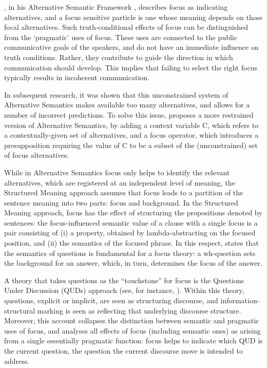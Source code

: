 \textcite{rooth1985association}, in his Alternative Semantic Framework \parencite{rooth1985association, rooth1992theory}, describes focus as indicating alternatives, and a focus sensitive particle is one whose meaning depends on those focal alternatives.
Such truth-conditional effects of focus can be distinguished from the `pragmatic’ uses of focus. These uses are connected to the public communicative goals of the speakers, and do not have an immediate influence on truth conditions. Rather, they contribute to guide the direction in which communication should develop. This implies that failing to select the right focus typically results in incoherent communication. 

In subsequent research, it was shown that this unconstrained system of Alternative Semantics makes available too many alternatives, and allows for a number of incorrect predictions. To solve this issue, \textcite{rooth1992theory} proposes a more restrained version of Alternative Semantics, by adding a context variable C, which refers to a contextually-given set of alternatives, and a focus operator, which introduces a presupposition requiring the value of C to be a subset of the (unconstrained) set of focus alternatives.

While in Alternative Semantics focus only helps to identify the relevant alternatives, which are registered at an independent level of meaning, the Structured Meaning approach \parencite{von1982structured, von1990current, jacobs2012fokus, krifka1991compositional, krifka2008basic} assumes that focus leads to a partition of the sentence meaning into two parts: focus and background. In the Structured Meaning approach, focus has the effect of structuring the propositions denoted by sentences: the focus-influenced semantic value of a clause with a single focus is a pair consisting of (i) a property, obtained by lambda-abstracting on the focused position, and (ii) the semantics of the focused phrase.
In this respect, \textcite[38]{von1991focusing} states that the semantics of questions is fundamental for a focus theory: a wh-question sets the background for an answer, which, in turn, determines the focus of the answer. 

A theory that takes questions as the ``touchstone” for focus is the Questions Under Discussion (QUDs) approach (see, for instance, \cite{roberts1996information, buring2003d, beaver2009sense}). Within this theory, 
questions, explicit or implicit, are seen as structuring discourse, and information-structural marking is seen as reflecting that underlying discourse structure. Moreover, this account collapses the distinction between semantic and pragmatic uses of focus, and analyses all effects of focus (including semantic ones) as arising from a single essentially pragmatic function: focus helps to indicate which QUD is the current question, the question the current discourse move is intended to address.


